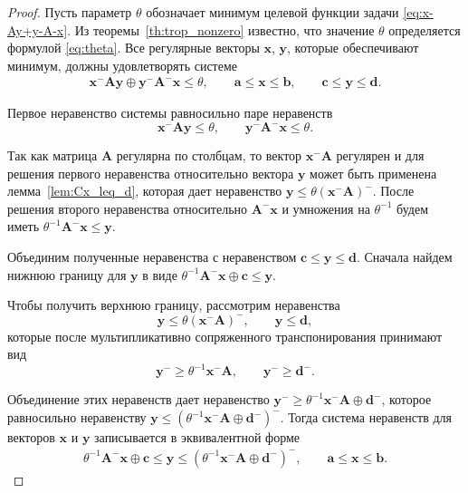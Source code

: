 \documentclass[specialist,
               substylefile = spbu.rtx,
               subf,href,colorlinks=true, 12pt]{disser}
\theoremstyle{definition}
\begin{document}
\begin{proof}
Пусть параметр $\theta$ обозначает минимум целевой функции задачи \eqref{eq:x-Ay+y-A-x}. Из теоремы~\ref{th:trop_nonzero} известно, что значение $\theta$ определяется формулой \eqref{eq:theta}.
Все регулярные векторы $\bm{x}$, $\bm{y}$, которые обеспечивают минимум, должны удовлетворять системе
\begin{gather*}
\bm{x}^{-}\bm{A}\bm{y}
\oplus
\bm{y}^{-}\bm{A}^{-}\bm{x}\leq\theta,
\qquad
\bm{a}\leq\bm{x}\leq\bm{b},
\qquad
\bm{c}\leq\bm{y}\leq\bm{d}.
\end{gather*}

Первое неравенство системы равносильно паре неравенств
\begin{equation*}
\bm{x}^{-}\bm{A}\bm{y}\leq\theta,
\qquad
\bm{y}^{-}\bm{A}^{-}\bm{x}\leq\theta.
\end{equation*}

Так как матрица $\bm{A}$ регулярна по столбцам, то вектор $\bm{x}^{-}\bm{A}$ регулярен и для решения первого неравенства относительно вектора $\bm{y}$ может быть применена лемма~\ref{lem:Cx_leq_d}, которая дает неравенство $\bm{y}\leq\theta(\bm{x}^{-}\bm{A})^{-}$.
После решения второго неравенства относительно $\bm{A}^{-}\bm{x}$ и умножения на $\theta^{-1}$ будем иметь $\theta^{-1}\bm{A}^{-}\bm{x}\leq\bm{y}$.

Объединим полученные неравенства с неравенством $\bm{c}\leq\bm{y}\leq\bm{d}$.
Сначала найдем нижнюю границу для $\bm{y}$ в виде $\theta^{-1}\bm{A}^{-}\bm{x}\oplus\bm{c}\leq\bm{y}$.

Чтобы получить верхнюю границу, рассмотрим неравенства 
\begin{equation*}
\bm{y}\leq\theta(\bm{x}^{-}\bm{A})^{-},
\qquad
\bm{y}\leq\bm{d},
\end{equation*}
 которые после мультипликативно сопряженного транспонирования принимают вид 
\begin{equation*}
\bm{y}^{-}\geq\theta^{-1}\bm{x}^{-}\bm{A},
\qquad
\bm{y}^{-}\geq\bm{d}^{-}.
\end{equation*} 

Объединение этих неравенств дает неравенство $\bm{y}^{-}\geq\theta^{-1}\bm{x}^{-}\bm{A}\oplus\bm{d}^{-}$, которое равносильно неравенству $\bm{y}\leq(\theta^{-1}\bm{x}^{-}\bm{A}\oplus\bm{d}^{-})^{-}$.
Тогда система неравенств для векторов $\bm{x}$ и $\bm{y}$ записывается в эквивалентной форме
\begin{gather*}
\theta^{-1}\bm{A}^{-}\bm{x}\oplus\bm{c}
\leq
\bm{y}
\leq
(\theta^{-1}\bm{x}^{-}\bm{A}\oplus\bm{d}^{-})^{-},
\qquad
\bm{a}\leq\bm{x}\leq\bm{b}.
\end{gather*}


\end{proof}
\end{document}

